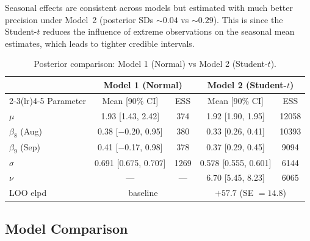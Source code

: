 \documentclass[10pt]{article}
\begin{document}
Seasonal effects are consistent across models but estimated with much better precision under Model~2 (posterior SDs ${\sim}0.04$ vs ${\sim}0.29$). This is since the Student-$t$ reduces the influence of extreme observations on the seasonal mean estimates, which leads to tighter credible intervals.

\begin{table}[H]
\centering\small
\caption{Posterior comparison: Model 1 (Normal) vs Model 2 (Student-$t$).}\label{tab:comparison}
\begin{tabular}{lcccc}
\toprule
 & \multicolumn{2}{c}{Model 1 (Normal)} & \multicolumn{2}{c}{Model 2 (Student-$t$)} \\
\cmidrule(lr){2-3}\cmidrule(lr){4-5}
Parameter & Mean [90\% CI] & ESS & Mean [90\% CI] & ESS \\
\midrule
$\mu$     & 1.93 [1.43, 2.42] & 374  & 1.92 [1.90, 1.95] & 12058 \\
$\beta_8$ (Aug) & 0.38 [$-$0.20, 0.95] & 380  & 0.33 [0.26, 0.41] & 10393 \\
$\beta_9$ (Sep) & 0.41 [$-$0.17, 0.98] & 378  & 0.37 [0.29, 0.45] & 9094 \\
$\sigma$  & 0.691 [0.675, 0.707] & 1269 & 0.578 [0.555, 0.601] & 6144 \\
$\nu$     & --- & --- & 6.70 [5.45, 8.23] & 6065 \\
\midrule
LOO elpd  & \multicolumn{2}{c}{baseline} & \multicolumn{2}{c}{$+57.7$ (SE $= 14.8$)} \\
\bottomrule
\end{tabular}
\end{table}

\subsection{Model Comparison}
\end{document}
